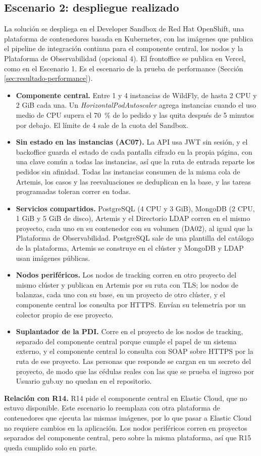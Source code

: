 \subsection{Escenario 2: despliegue realizado}

La solución se despliega en el Developer Sandbox de Red Hat OpenShift, una plataforma de contenedores basada en Kubernetes, con las imágenes que publica el pipeline de integración continua para el componente central, los nodos y la Plataforma de Observabilidad (opcional 4). El frontoffice se publica en Vercel, como en el Escenario 1. Es el escenario de la prueba de performance (Sección \ref{sec:resultado-performance}).

\begin{itemize}
    \item \textbf{Componente central.} Entre 1 y 4 instancias de WildFly, de hasta 2 CPU y 2 GiB cada una. Un \emph{HorizontalPodAutoscaler} agrega instancias cuando el uso medio de CPU supera el 70~\% de lo pedido y las quita después de 5 minutos por debajo. El límite de 4 sale de la cuota del Sandbox.
    \item \textbf{Sin estado en las instancias (AC07).} La API usa JWT sin sesión, y el backoffice guarda el estado de cada pantalla cifrado en la propia página, con una clave común a todas las instancias, así que la ruta de entrada reparte los pedidos sin afinidad. Todas las instancias consumen de la misma cola de Artemis, los casos y las reevaluaciones se deduplican en la base, y las tareas programadas toleran correr en todas.
    \item \textbf{Servicios compartidos.} PostgreSQL (4 CPU y 3 GiB), MongoDB (2 CPU, 1 GiB y 5 GiB de disco), Artemis y el Directorio LDAP corren en el mismo proyecto, cada uno en su contenedor con su volumen (DA02), al igual que la Plataforma de Observabilidad. PostgreSQL sale de una plantilla del catálogo de la plataforma, Artemis se construye en el clúster y MongoDB y LDAP usan imágenes públicas.
    \item \textbf{Nodos periféricos.} Los nodos de tracking corren en otro proyecto del mismo clúster y publican en Artemis por su ruta con TLS; los nodos de balanzas, cada uno con su base, en un proyecto de otro clúster, y el componente central los consulta por HTTPS. Envían su telemetría por un colector propio de ese proyecto.
    \item \textbf{Suplantador de la PDI.} Corre en el proyecto de los nodos de tracking, separado del componente central porque cumple el papel de un sistema externo, y el componente central lo consulta con SOAP sobre HTTPS por la ruta de ese proyecto. Las personas que responde se cargan en un secreto del proyecto, de modo que las cédulas reales con las que se prueba el ingreso por Usuario gub.uy no quedan en el repositorio.
\end{itemize}

\textbf{Relación con R14.} R14 pide el componente central en Elastic Cloud, que no estuvo disponible. Este escenario lo reemplaza con otra plataforma de contenedores que ejecuta las mismas imágenes, por lo que pasar a Elastic Cloud no requiere cambios en la aplicación. Los nodos periféricos corren en proyectos separados del componente central, pero sobre la misma plataforma, así que R15 queda cumplido solo en parte.
